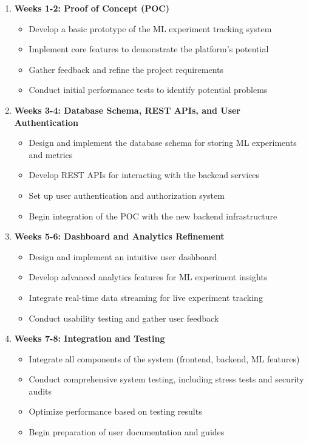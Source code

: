 \documentclass[12pt]{article}
\begin{document}
\begin{enumerate}
    \item \textbf{Weeks 1-2: Proof of Concept (POC)}
    \begin{itemize}
        \item Develop a basic prototype of the ML experiment tracking system
        \item Implement core features to demonstrate the platform's potential
        \item Gather feedback and refine the project requirements
        \item Conduct initial performance tests to identify potential problems
    \end{itemize}

    \item \textbf{Weeks 3-4: Database Schema, REST APIs, and User Authentication}
    \begin{itemize}
        \item Design and implement the database schema for storing ML experiments and metrics
        \item Develop REST APIs for interacting with the backend services
        \item Set up user authentication and authorization system
        \item Begin integration of the POC with the new backend infrastructure
    \end{itemize}

    \item \textbf{Weeks 5-6: Dashboard and Analytics Refinement}
    \begin{itemize}
        \item Design and implement an intuitive user dashboard
        \item Develop advanced analytics features for ML experiment insights
        \item Integrate real-time data streaming for live experiment tracking
        \item Conduct usability testing and gather user feedback
    \end{itemize}

    \item \textbf{Weeks 7-8: Integration and Testing}
    \begin{itemize}
        \item Integrate all components of the system (frontend, backend, ML features)
        \item Conduct comprehensive system testing, including stress tests and security audits
        \item Optimize performance based on testing results
        \item Begin preparation of user documentation and guides
    \end{itemize}


\end{enumerate}
\end{document}
